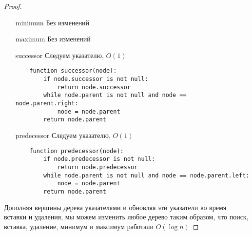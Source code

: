 \begin{proof}
\begin{itemize}
\item[minimum] Без изменений
\item[maximum] Без изменений
\item[successor] Следуем указателю, $O(1)$
    \begin{lstlisting}
    function successor(node):
        if node.successor is not null:
            return node.successor
        while node.parent is not null and node == node.parent.right:
            node = node.parent
        return node.parent
    \end{lstlisting}
\item[predecessor] Следуем указателю, $O(1)$
    \begin{lstlisting}
    function predecessor(node):
        if node.predecessor is not null:
            return node.predecessor
        while node.parent is not null and node == node.parent.left:
            node = node.parent
        return node.parent
    \end{lstlisting}
\end{itemize}
Дополняя вершины дерева указателями и обновляя эти указатели во время вставки и удаления, мы можем изменить любое дерево таким образом, что поиск, вставка, удаление, минимум и максимум работали $O(\log n)$
\end{proof}
\vskip 0.6in



